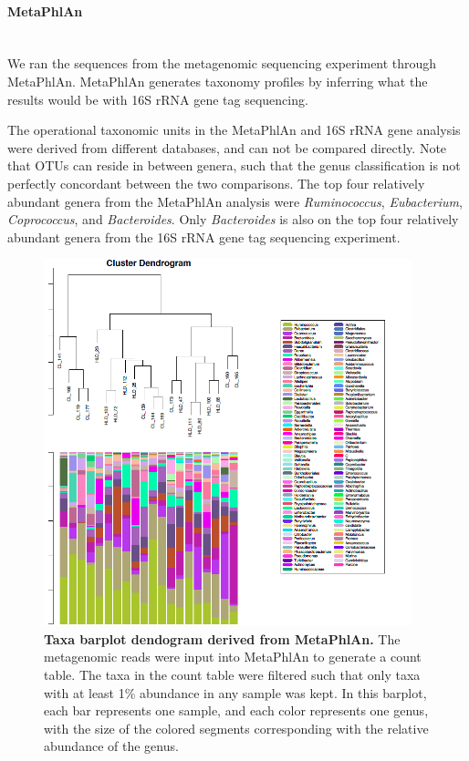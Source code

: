 \FloatBarrier

\paragraph{MetaPhlAn}\mbox{}\\
We ran the sequences from the metagenomic sequencing experiment through MetaPhlAn. MetaPhlAn generates taxonomy profiles by inferring what the results would be with 16S rRNA gene tag sequencing.

The operational taxonomic units in the MetaPhlAn and 16S rRNA gene analysis were derived from different databases, and can not be compared directly. Note that OTUs can reside in between genera, such that the genus classification is not perfectly concordant between the two comparisons. The top four relatively abundant genera from the MetaPhlAn analysis were \textit{Ruminococcus}, \textit{Eubacterium}, \textit{Coprococcus}, and \textit{Bacteroides}. Only \textit{Bacteroides} is also on the top four relatively abundant genera from the 16S rRNA gene tag sequencing experiment.

\begin{figure}[h]
\begin{center}
\includegraphics[width=0.95\textwidth]{metaphlan_barplot_dendogram.png}
\caption[Taxa barplot dendogram derived from MetaPhlAn.]{\textbf{Taxa barplot dendogram derived from MetaPhlAn.} The metagenomic reads were input into MetaPhlAn to generate a count table. The taxa in the count table were filtered such that only taxa with at least 1\% abundance in any sample was kept. In this barplot, each bar represents one sample, and each color represents one genus, with the size of the colored segments corresponding with the relative abundance of the genus.}
\label{nafld_metaphlan_barplot}
\end{center}
\end{figure}

